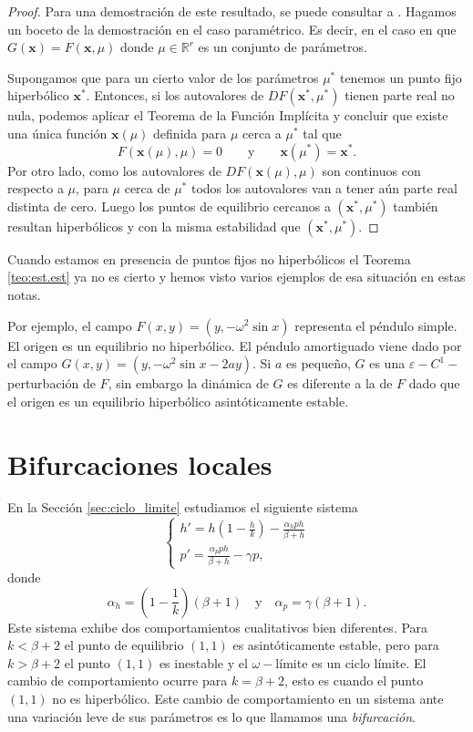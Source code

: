\documentclass[12pt, a4paper]{amsbook}
\newcommand{\ve}{\varepsilon}
\newcommand{\R}{{\mathbb R}}
\newcommand{\xx}{{\mathbf x}}
\theoremstyle{remark}
\theoremstyle{definition}
\numberwithin{section}{chapter}
\numberwithin{subsection}{section}
\numberwithin{equation}{section}
\numberwithin{figure}{chapter}
\begin{document}
\begin{proof}
Para una demostración de este resultado, se puede consultar a \cite{Hirsch-Smale-Devaney, Perko}. Hagamos un boceto de la demostración en el caso paramétrico. Es decir, en el caso en que $G(\xx) = F(\xx, \mu)$ donde $\mu\in\R^r$ es un conjunto de parámetros.

Supongamos que para un cierto valor de los parámetros $\mu^*$ tenemos un punto fijo hiperbólico $\xx^*$. Entonces, si los autovalores de $DF(\xx^*,\mu^*)$ tienen parte real no nula, podemos aplicar el Teorema de la Función Implícita y concluir que existe una única función $\xx(\mu)$ definida para $\mu$ cerca a $\mu^*$ tal que
$$
F(\xx(\mu),\mu)=0 \qquad \text{y}\qquad \xx(\mu^*)=\xx^*.
$$
Por otro lado, como los autovalores de $DF(\xx(\mu),\mu)$ son continuos con respecto a $\mu$, para $\mu$ cerca de $\mu^*$ todos los autovalores van a tener aún parte real distinta de cero. Luego los puntos de equilibrio cercanos a $(\xx^*,\mu^*)$ también resultan hiperbólicos y con la misma estabilidad que $(\xx^*,\mu^*)$.
\end{proof}

Cuando estamos en presencia de puntos fijos no hiperbólicos el Teorema \ref{teo:est.est} ya no es cierto y hemos visto varios ejemplos de esa situación en estas notas.

Por ejemplo, el campo $F(x, y) = (y, -\omega^2\sin x)$ representa el péndulo simple. El origen es un equilibrio no hiperbólico. El péndulo amortiguado viene dado por el campo $G(x, y) = (y, -\omega^2\sin x - 2a y)$. Si $a$ es pequeño, $G$ es una $\ve-C^1-$perturbación de $F$, sin embargo la dinámica de $G$ es diferente a la de $F$ dado que el origen es un equilibrio hiperbólico asintóticamente estable.

\section{Bifurcaciones locales}

En la Sección \ref{sec:ciclo_limite} estudiamos el siguiente sistema
$$
\begin{cases}
h' = h\left(1-\frac{h}{k}\right) - \frac{\alpha_h ph}{\beta + h}\\
p' = \frac{\alpha_p ph}{\beta + h} - \gamma p,
\end{cases}
$$
donde 
$$
\alpha_h = \left(1-\frac{1}{k}\right) (\beta+1)\quad \text{y}\quad \alpha_p = \gamma(\beta+1).
$$
Este sistema exhibe dos comportamientos cualitativos bien diferentes. Para $k<\beta+2$ el punto de equilibrio $(1,1)$ es asintóticamente estable, pero para $k>\beta+2$ el punto $(1,1)$ es inestable y el $\omega-$límite es un ciclo límite. El cambio de comportamiento ocurre para $k=\beta+2$, esto es cuando el punto $(1,1)$ no es hiperbólico. Este cambio de comportamiento en un sistema ante una variación leve de sus parámetros es lo que llamamos una {\em bifurcación}.
\end{document}
